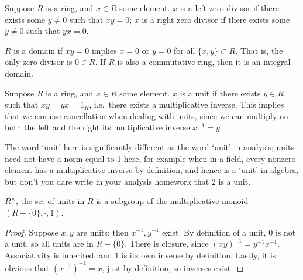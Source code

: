 \begin{definition}
    Suppose \(R\) is a ring, and \(x \in R\) some element.
    \(x\) is a left zero divisor if there exists some \(y \neq 0\)
    such that \(xy = 0\);
    \(x\) is a right zero divisor if there exists some \(y \neq 0\)
    such that \(yx = 0\).
\end{definition}
\begin{definition}
    \(R\) is a domain if \(xy = 0\)
    implies \(x = 0\) or \(y = 0\) for all \(\{x,y\} \subset R\).
    That is, the only zero divisor is \(0 \in R\).
    If \(R\) is also a commutative ring,
    then it is an integral domain.
\end{definition}

\begin{definition}
    Suppose \(R\) is a ring, and \(x \in R\) some element.
    \(x\) is a unit if there exists \(y \in R\)
    such that \(xy = yx = 1_R\),
    i.e.\ there exists a multiplicative inverse.
    This implies that we can use cancellation when dealing with units,
    since we can multiply on both the left and the right
    its multiplicative inverse \(x^{-1} = y\).
\end{definition}
\begin{remark}
    The word `unit' here is significantly different
    as the word `unit' in analysis;
    units need not have a norm equal to 1 here,
    for example when in a field,
    every nonzero element has a multiplicative inverse by definition,
    and hence is a `unit' in algebra,
    but don't you dare write in your analysis homework
    that \(2\) is a unit.
\end{remark}
\begin{proposition}\label{prop:ring-unit-subgroup}
    \(R^\times\), the set of units in \(R\) is a subgroup
    of the multiplicative monoid \((R - \{0\},\cdot,1)\).
\end{proposition}
\begin{proof}
    Suppose \(x,y\) are units; then \(x^{-1},y^{-1}\) exist.
    By definition of a unit, \(0\) is not a unit,
    so all units are in \(R - \{0\}\).
    There is closure, since \({(xy)}^{-1} = y^{-1}x^{-1}\).
    Associativity is inherited,
    and \(1\) is its own inverse by definition.
    Lastly, it is obvious that \({(x^{-1})}^{-1} = x\),
    just by definition, so inverses exist.
\end{proof}

